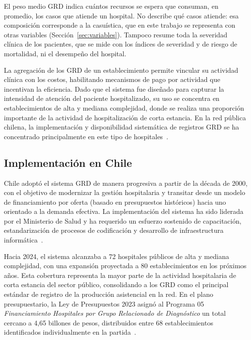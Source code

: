El peso medio GRD indica cuántos recursos se espera que consuman, en promedio,
los casos que atiende un hospital. No describe qué casos atiende: esa
composición corresponde a la casuística, que en este trabajo se representa con
otras variables (Sección~\ref{sec:variables}). Tampoco resume toda la severidad
clínica de los pacientes, que se mide con los índices de severidad y de riesgo
de mortalidad, ni el desempeño del hospital.

La agregación de los GRD de un establecimiento permite vincular su actividad
clínica con los costos, habilitando
mecanismos de pago por actividad que incentivan la eficiencia. Dado que el
sistema fue diseñado para capturar la intensidad de atención del paciente
hospitalizado, su uso se concentra en establecimientos de alta y mediana
complejidad, donde se realiza una proporción importante de la actividad de
hospitalización de corta estancia. En la red pública chilena, la implementación
y disponibilidad sistemática de registros GRD se ha concentrado principalmente
en este tipo de hospitales~\citep{Cid2024}.


\subsection{Implementación en Chile}
\label{sec:grd-chile}

Chile adoptó el sistema GRD de manera progresiva a partir de la década de 2000,
con el objetivo de modernizar la gestión hospitalaria y transitar desde un modelo
de financiamiento por oferta (basado en presupuestos históricos) hacia uno
orientado a la demanda efectiva. La implementación del sistema ha sido liderada
por el Ministerio de Salud y ha requerido un esfuerzo sostenido de capacitación,
estandarización de procesos de codificación y desarrollo de infraestructura
informática~\citep{Cid2024}.

Hacia 2024, el sistema alcanzaba a 72 hospitales públicos de alta y mediana
complejidad, con una expansión proyectada a 80 establecimientos en los próximos
años. Esta cobertura representa la mayor parte de la actividad hospitalaria de
corta estancia del sector público, consolidando a los GRD como el principal
estándar de registro de la producción asistencial en la red. En el plano
presupuestario, la Ley de Presupuestos 2023 asignó al Programa 05
\textit{Financiamiento Hospitales por Grupo Relacionado de Diagnóstico} un total
cercano a 4{,}65 billones de pesos, distribuidos entre 68 establecimientos
identificados individualmente en la partida~\citep{DIPRES_Programa05_2023}.

